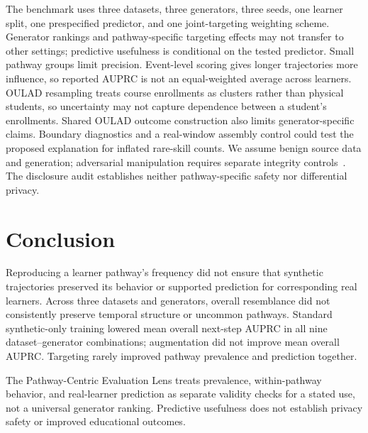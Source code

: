 \documentclass[fleqn,10pt]{JLA_article}
\begin{document}
The benchmark uses three datasets, three generators, three seeds, one learner split, one prespecified predictor, and one joint-targeting weighting scheme. Generator rankings and pathway-specific targeting effects may not transfer to other settings; predictive usefulness is conditional on the tested predictor. Small pathway groups limit precision. Event-level scoring gives longer trajectories more influence, so reported AUPRC is not an equal-weighted average across learners. OULAD resampling treats course enrollments as clusters rather than physical students, so uncertainty may not capture dependence between a student's enrollments. Shared OULAD outcome construction also limits generator-specific claims. Boundary diagnostics and a real-window assembly control could test the proposed explanation for inflated rare-skill counts. We assume benign source data and generation; adversarial manipulation requires separate integrity controls~\cite{liu2026quality}. The disclosure audit establishes neither pathway-specific safety nor differential privacy.

\section{Conclusion}

Reproducing a learner pathway's frequency did not ensure that synthetic trajectories preserved its behavior or supported prediction for corresponding real learners. Across three datasets and generators, overall resemblance did not consistently preserve temporal structure or uncommon pathways. Standard synthetic-only training lowered mean overall next-step AUPRC in all nine dataset--generator combinations; augmentation did not improve mean overall AUPRC. Targeting rarely improved pathway prevalence and prediction together.

The Pathway-Centric Evaluation Lens treats prevalence, within-pathway behavior, and real-learner prediction as separate validity checks for a stated use, not a universal generator ranking. Predictive usefulness does not establish privacy safety or improved educational outcomes.



\end{document}
